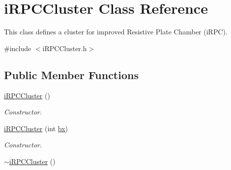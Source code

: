 \hypertarget{classiRPCCluster}{\section{i\-R\-P\-C\-Cluster Class Reference}
\label{classiRPCCluster}
}


This class defines a cluster for improved Resistive Plate Chamber (i\-R\-P\-C).  




{\ttfamily \#include $<$i\-R\-P\-C\-Cluster.\-h$>$}

\subsection*{Public Member Functions}
\begin{DoxyCompactItemize}
\item 
\hypertarget{classiRPCCluster_a08fe677fed4795406629b2ff232fc813}{\hyperlink{classiRPCCluster_a08fe677fed4795406629b2ff232fc813}{i\-R\-P\-C\-Cluster} ()}\label{classiRPCCluster_a08fe677fed4795406629b2ff232fc813}

\begin{DoxyCompactList}\small\item\em Constructor. \end{DoxyCompactList}\item 
\hyperlink{classiRPCCluster_a6d3b8a059541bb23098588f3dc9cfac1}{i\-R\-P\-C\-Cluster} (int \hyperlink{classiRPCCluster_a4834badf4c95d5b152da4dbe8f07d5fa}{bx})
\begin{DoxyCompactList}\small\item\em Constructor. \end{DoxyCompactList}\item 
\hypertarget{classiRPCCluster_a3fe74630f7e0d769be2d47961362c42e}{\hyperlink{classiRPCCluster_a3fe74630f7e0d769be2d47961362c42e}{$\sim$i\-R\-P\-C\-Cluster} ()}\label{classiRPCCluster_a3fe74630f7e0d769be2d47961362c42e}


\end{DoxyCompactItemize}
